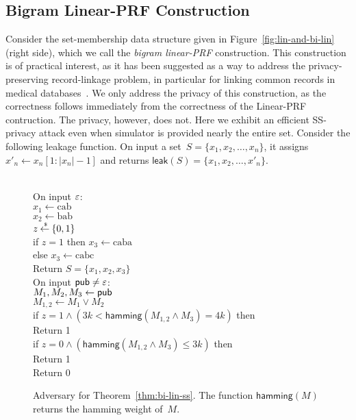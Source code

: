 \subsection{Bigram Linear-PRF Construction}
Consider the set-membership data structure given in Figure~\ref{fig:lin-and-bi-lin} (right side), which we call the \emph{bigram linear-PRF} construction.  This construction is of practical interest, as it has been suggested as a way to address the privacy-preserving record-linkage problem, in particular for linking common records in medical databases~\cite{neidermayer,xxx}. 
We only address the privacy of this construction, as the correctness follows immediately from the correctness of the Linear-PRF contruction.  The privacy, however, does not.  Here we exhibit an efficient SS-privacy attack even when simulator is provided nearly the entire set.  Consider the following leakage function.  On input a set~$S=\{x_1,x_2,\ldots,x_n\}$, it assigns $x'_n \gets x_n[1:|x_n|-1]$ and returns $\mathsf{leak}(S)=\{x_1,x_2,\ldots,x'_n\}$.  

\begin{figure}
\centering
{}
{
\\
On input $\varepsilon$:\\
\nudge $x_1 \gets \mathrm{cab}$\\
\nudge $x_2 \gets \mathrm{bab}$\\
\nudge $z {\:\stackrel{{\scriptscriptstyle \hspace{0.2em}\$}} {\leftarrow}\:} \{0,1\}$\\
\nudge if $z=1$ then $x_3 \gets \mathrm{caba}$\\
\nudge else $x_3 \gets \mathrm{cabc}$\\
\nudge Return $S=\{x_1,x_2,x_3\}$\\
On input ${\sf pub} \neq \varepsilon$:\\
\nudge $M_1,M_2,M_3 \gets {\sf pub}$\\
\nudge $M_{1,2} \gets M_1 \vee M_2$\\
\nudge if $z=1 \wedge \left(3k < \mathsf{hamming}(M_{1,2} \wedge M_3) = 4k\right)$ then \\
\nudge\nudge Return 1 \\
\nudge if $z=0 \wedge \left(\mathsf{hamming}(M_{1,2} \wedge M_3) \leq 3k\right)$ then \\
\nudge\nudge Return 1 \\
\nudge Return 0
}
\caption{Adversary for Theorem~\ref{thm:bi-lin-ss}. The function $\mathsf{hamming}(M)$ returns the hamming weight of~$M$.}
\label{fig:adv-bi-lin-ss}
\end{figure}

